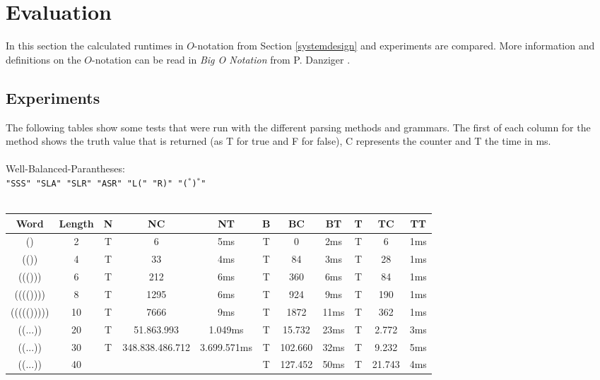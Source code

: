 \documentclass[a4paper, 11pt]{article}
\begin{document}

\pagebreak













\section{Evaluation}
\label{evaluation}

In this section the calculated runtimes in $O$-notation from Section \ref{systemdesign} and experiments are compared. More information and definitions on the $O$-notation can be read in \textit{Big O Notation} from P. Danziger \cite{bigO}.


\subsection{Experiments}
\label{experiments}

The following tables show some tests that were run with the different parsing methods and grammars. The first of each column for the method shows the truth value that is returned (as T for true and F for false), C represents the counter and T the time in ms.
\\
\\
Well-Balanced-Parantheses: \\
\texttt{"SSS" "SLA" "SLR" "ASR" "L(" "R)" "($^*$)$^*$"}
\ \\ \\
\begin{small}
\begin{tabular}{|c|c||c|c|c||c|c|c||c|c|c|}
\hline
Word & Length & N & NC & NT & B & BC & BT & T & TC & TT \\
\hline
\hline
() & 2 & T & 6 & 5ms & T & 0 & 2ms & T & 6 & 1ms \\
\hline
(()) & 4 & T & 33 & 4ms & T & 84 & 3ms & T & 28 & 1ms \\
\hline
((())) & 6 & T & 212 & 6ms & T & 360 & 6ms & T & 84 & 1ms \\
\hline
(((()))) & 8 & T & 1295 & 6ms & T & 924 & 9ms & T & 190 & 1ms \\
\hline
((((())))) & 10 & T & 7666 & 9ms & T & 1872 & 11ms & T & 362 & 1ms \\
\hline
((...)) & 20 & T & 51.863.993 & 1.049ms & T & 15.732 & 23ms & T & 2.772 & 3ms \\
\hline
((...)) & 30 & T & 348.838.486.712 & 3.699.571ms & T & 102.660 & 32ms & T & 9.232 & 5ms \\
\hline
((...)) & 40 & & & & T & 127.452 & 50ms & T & 21.743 & 4ms \\
\hline
\end{tabular}
\end{small}
\end{document}

